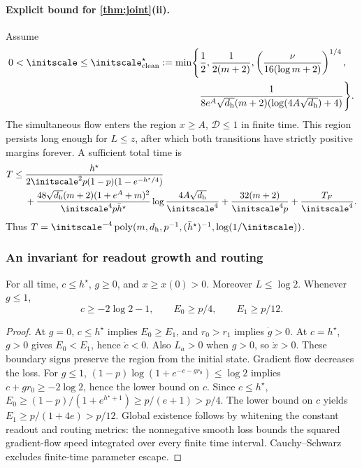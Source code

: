 \paragraph{Explicit bound for \cref{thm:joint}(ii).}
Assume
\begin{equation}
 \begin{aligned}
 0<\initscale\le\initscale^\star_{\mathrm{clean}}:=\min\Biggl\{&\frac12,\frac1{2(m+2)},
 \left(\frac{\nu}{16(\log m+2)}\right)^{1/4},\\
 &\frac1{8e^A\sqrt{d_{\mathrm h}}(m+2)(\log(4A\sqrt{d_{\mathrm h}})+4)}\Biggr\}.
 \end{aligned}
 \label{eq:CR-scale}
\end{equation}
The simultaneous flow enters the region $x\ge A$, $\mathcal D\le1$ in finite time. This region persists long enough for $L\le z$, after which both transitions have strictly positive margins forever. A sufficient total time is
\begin{align}
 T\le{}&\frac{h^\star}{2\initscale^2 p(1-p)(1-e^{-h^\star/4})}\notag\\
 &+\frac{48\sqrt{d_{\mathrm h}}(m+2)(1+e^A+m)^2}{\initscale^4p\bar h^\star}
       \log\frac{4A\sqrt{d_{\mathrm h}}}{\initscale^4}
 +\frac{32(m+2)}{\initscale^4p}+\frac{T_F}{\initscale^4}.\label{eq:CR-time}
\end{align}
Thus $T=\initscale^{-4}\operatorname{poly}(m,d_{\mathrm h},p^{-1},(\bar h^\star)^{-1},\log(1/\initscale))$.

\subsubsection{An invariant for readout growth and routing}
\begin{lemma}
\label{lem:CR-align}
For all time, $c\le h^\star$, $g\ge0$, and $x\ge x(0)>0$. Moreover $L\le\log2$. Whenever $g\le1$,
\[
 c\ge-2\log2-1,\qquad E_0\ge p/4,\qquad E_1\ge p/12.
\]
\end{lemma}
\begin{proof}
At $g=0$, $c\le h^\star$ implies $E_0\ge E_1$, and $r_0>r_1$ implies $\dot g>0$.
At $c=h^\star$, $g>0$ gives $E_0<E_1$, hence $\dot c<0$. Also $L_a>0$ when $g>0$, so $\dot x>0$.
These boundary signs preserve the region from the initial state. Gradient flow decreases the loss.
For $g\le1$, $(1-p)\log(1+e^{-c-gr_0})\le\log2$ implies $c+gr_0\ge-2\log2$, hence the lower bound on $c$.
Since $c\le h^\star$,
$E_0\ge(1-p)/(1+e^{h^\star+1})\ge p/(e+1)>p/4$.
The lower bound on $c$ yields $E_1\ge p/(1+4e)>p/12$.
Global existence follows by whitening the constant readout and routing metrics: the nonnegative smooth loss bounds the squared gradient-flow speed integrated over every finite time interval. Cauchy--Schwarz excludes finite-time parameter escape.
\end{proof}

